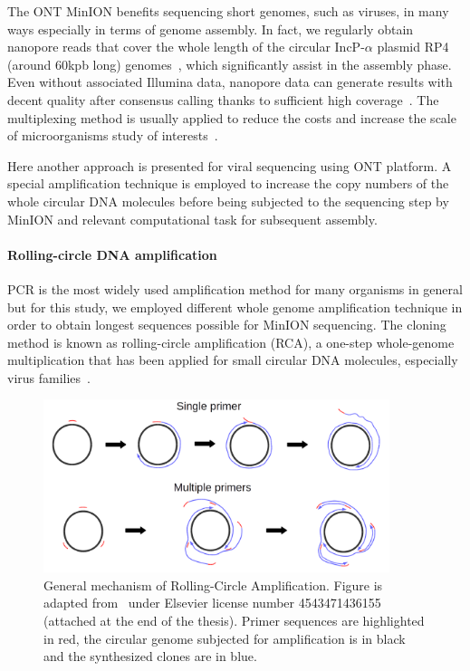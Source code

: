 The ONT MinION benefits sequencing short genomes, such as viruses, in many ways especially in terms of genome assembly. 
In fact, we regularly obtain nanopore reads that cover the whole length of the circular IncP-$\alpha$ plasmid RP4 (around $60$kpb long) genomes~\cite{Lu2018plamids}, which significantly assist in the assembly phase.   
Even without associated Illumina data, nanopore data can generate results with decent quality after consensus calling thanks to sufficient high coverage~\cite{Vaser2017racon}.
The multiplexing method is usually applied to reduce the costs and increase the scale of microorganisms study of interests~\cite{Quick2017GP}.

Here another approach is presented for viral sequencing using ONT platform. A special amplification technique is employed to increase the copy numbers of the whole circular DNA molecules before being subjected to the sequencing step by MinION and relevant computational task for subsequent assembly.

\paragraph{Rolling-circle DNA amplification}
PCR is the most widely used amplification method for many organisms in general but for this study, we employed different whole genome amplification technique in order to obtain longest sequences possible for MinION sequencing.
The cloning method is known as rolling-circle amplification (RCA), a one-step whole-genome multiplication that has been applied for small circular DNA molecules, especially virus families~\cite{Rector2004rca14,Inoue2004rca28,Schubert2007rca30,Knierim200rca31,Shepherd2008rca32,Haible2006rca33,Homs2008rca34}.

\begin{figure}[!hpt]
\centerline{\includegraphics[width=0.9\textwidth]{images/rca.png}}
\caption[Rolling Circle Amplification]{General mechanism of Rolling-Circle Amplification. Figure is adapted from~\cite{Johne2009rca} under Elsevier license number 4543471436155 (attached at the end of the thesis). Primer sequences are highlighted in red, the circular genome subjected for amplification is in black and the synthesized clones are in blue.}
\label{fig:concat_rca}
\end{figure}

